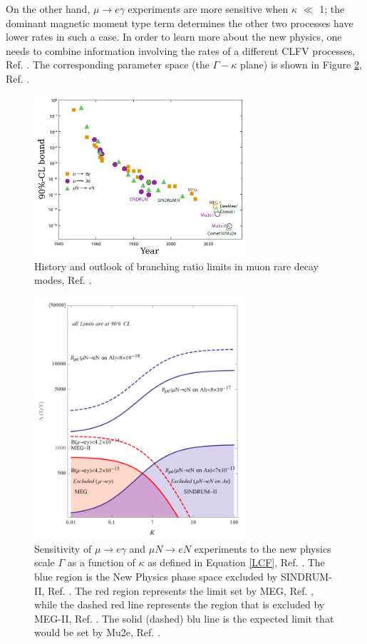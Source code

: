 On the other hand, $\mu \rightarrow e\gamma$ experiments are more sensitive when $\kappa$ $\ll$ 1; the dominant magnetic
moment type term determines the other two processes have lower rates in such a case. In order to learn more about the new
physics, one needs to combine information involving the rates of a different CLFV processes, Ref. \cite{osti_1042577}.
The corresponding parameter space (the $\Gamma-\kappa$ plane) is shown in Figure \ref{fig:muchannelbr}, Ref. \cite{doi:10.1146/annurev-nucl-100809-131949}.
\begin{figure}[!h]
\centering
\includegraphics[width =0.7\textwidth]{figures/png/Screenshot_20240307_161549.png}
\caption{History and outlook of branching ratio limits in muon rare decay modes, Ref. \cite{MARCIANO1977303}.}
\label{fig:muchannel}
\end{figure}
\begin{figure}[!h]
\centering
\includegraphics[width =0.7\textwidth]{figures/png/Screenshot_20240313_120457.png}
\caption{Sensitivity of $\mu \rightarrow e\gamma$ and $\mu N \rightarrow eN$ experiments to the new physics
scale $\Gamma$ as a function of $\kappa$ as defined in Equation \ref{LCF}, Ref. \cite{CGroup:2022tli}. The blue region is the New
Physics phase space excluded by SINDRUM-II, Ref. \cite{SINDRUMII:2006dvw}. The red region represents the
limit set by MEG, Ref. \cite{megi}, while the dashed red line represents the region that is
excluded by MEG-II, Ref. \cite{megiicollaboration2024search}. The solid (dashed) blu line is the
expected limit that would be set by Mu2e, Ref. \cite{universe9010054}.}
\label{fig:muchannelbr}
\end{figure}
